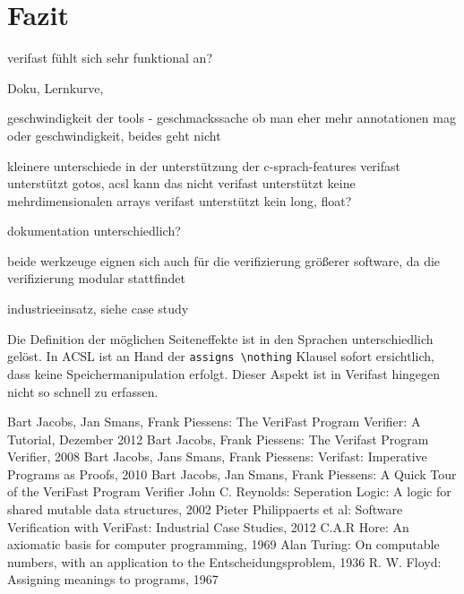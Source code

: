 ﻿\chapter{Fazit}

verifast fühlt sich sehr funktional an?

Doku, Lernkurve, 

geschwindigkeit der tools - geschmackssache ob man eher mehr annotationen mag oder geschwindigkeit, beides geht nicht


kleinere unterschiede in der unterstützung der c-sprach-features
	verifast unterstützt gotos, acsl kann das nicht
	verifast unterstützt keine mehrdimensionalen arrays
	verifast unterstützt kein long, float?
	
dokumentation unterschiedlich?
	
beide werkzeuge eignen sich auch für die verifizierung größerer software, da die verifizierung modular stattfindet

industrieeinsatz, siehe case study

Die Definition der möglichen Seiteneffekte ist in den Sprachen unterschiedlich gelöst. In ACSL
ist an Hand der \lstinline{assigns \nothing} Klausel sofort ersichtlich, dass keine Speichermanipulation
erfolgt. Dieser Aspekt ist in Verifast hingegen nicht so schnell zu erfassen.

\begin{thebibliography}{}
 Bart Jacobs, Jan Smans, Frank Piessens: The VeriFast Program Verifier: A Tutorial, Dezember 2012
 Bart Jacobs, Frank Piessens: The Verifast Program Verifier, 2008
 Bart Jacobs, Jans Smans, Frank Piessens: Verifast: Imperative Programs as Proofs, 2010
 Bart Jacobs, Jan Smans, Frank Piessens: A Quick Tour of the VeriFast Program Verifier
 John C. Reynolds: Seperation Logic: A logic for shared mutable data structures, 2002
 Pieter Philippaerts et al: Software Verification with VeriFast: Industrial Case Studies, 2012
 C.A.R Hore: An axiomatic basis for computer programming, 1969
 Alan Turing: On computable numbers, with an application to the Entscheidungsproblem, 1936
 R. W. Floyd: Assigning meanings to programs, 1967
\end{thebibliography}